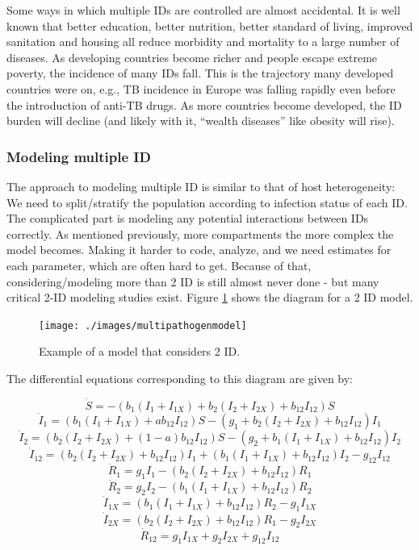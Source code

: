 \documentclass[
]{book}
\begin{document}
Some ways in which multiple IDs are controlled are almost accidental. It is well known that better education, better nutrition, better standard of living, improved sanitation and housing all reduce morbidity and mortality to a large number of diseases. As developing countries become richer and people escape extreme poverty, the incidence of many IDs fall. This is the trajectory many developed countries were on, e.g., TB incidence in Europe was falling rapidly even before the introduction of anti-TB drugs. As more countries become developed, the ID burden will decline (and likely with it, ``wealth diseases'' like obesity will rise).

\hypertarget{myadvancedbox}{%
\subsubsection{Modeling multiple ID}\label{myadvancedbox}}

The approach to modeling multiple ID is similar to that of host heterogeneity: We need to split/stratify the population according to infection status of each ID. The complicated part is modeling any potential interactions between IDs correctly.
As mentioned previously, more compartments the more complex the model becomes. Making it harder to code, analyze, and we need estimates for each parameter, which are often hard to get. Because of that, considering/modeling more than 2 ID is still almost never done - but many critical 2-ID modeling studies exist. Figure \ref{fig:coinfection} shows the diagram for a 2 ID model.

\begin{figure}
\texttt{[image: ./images/multipathogenmodel]} \caption{Example of a model that considers 2 ID.}\label{fig:coinfection}
\end{figure}

The differential equations corresponding to this diagram are given by:

\[\dot S =  -  (b_{1} (I_1+I_{1X}) + b_{2} (I_2+I_{2X}) + b_{12}I_{12}) S  \]
\[\dot I_1 =   (b_{1} (I_1+I_{1X}) + ab_{12} I_{12})S - (g_1  + b_{2} (I_2+I_{2X})  + b_{12}  I_{12}) I_1\]
\[\dot I_2 =   (b_{2} (I_2+I_{2X}) +  (1-a) b_{12} I_{12})S - (g_2 + b_{1}(I_1 + I_{1X}) + b_{12} I_{12}) I_2\]
\[\dot I_{12} = (b_{2} (I_2+I_{2X})  + b_{12}  I_{12}) I_1 + (b_{1}(I_1 + I_{1X}) + b_{12} I_{12}) I_2  - g_{12} I_{12}\]
\[\dot R_1 = g_1 I_1 - (b_2 (I_2 + I_{2X}) + b_{12}  I_{12}) R_1\]
\[\dot R_2 = g_2 I_2 - (b_1 (I_1 + I_{1X}) + b_{12}  I_{12}) R_2\]
\[\dot I_{1X} = (b_1 (I_1 + I_{1X}) + b_{12}  I_{12}) R_2 - g_{1} I_{1X}\]
\[\dot I_{2X} = (b_2 (I_2 + I_{2X}) + b_{12}  I_{12}) R_1 - g_{2} I_{2X}\]
\[\dot R_{12} = g_{1} I_{1X} + g_{2} I_{2X} + g_{12} I_{12} \]
\end{document}
